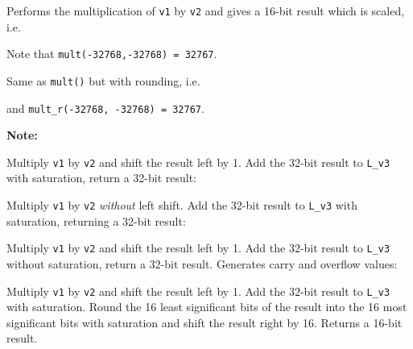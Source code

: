 Performs the multiplication of {\tt v1} by {\tt v2} and gives a 16-bit
result which is scaled, i.e.


Note that {\tt mult(-32768,-32768) = 32767}.


Same as {\tt mult()} but with rounding, i.e.


and {\tt mult\_r(-32768, -32768) = 32767}.

\textbf{Note:} \hfill {}


Multiply {\tt v1} by {\tt v2} and shift the result left by 1. Add the
32-bit result to {\tt L\_v3} with saturation, return a 32-bit result:



Multiply {\tt v1} by {\tt v2} {\em without} left shift. Add the 32-bit
result to {\tt L\_v3} with saturation, returning a 32-bit result:



Multiply {\tt v1} by {\tt v2} and shift the result left by 1. Add the
32-bit result to {\tt L\_v3} without saturation, return a 32-bit
result. Generates carry and overflow values:



Multiply {\tt v1} by {\tt v2} and shift the result left by 1. Add
the 32-bit result to {\tt L\_v3} with saturation. Round the 16
least significant bits of the result into the 16 most significant
bits with saturation and shift the result right by 16. Returns a
16-bit result.

